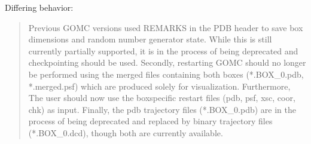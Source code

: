 \documentclass[letterpaper,10pt,english]{sphinxmanual}
\begin{document}
\sphinxAtStartPar
Differing behavior:
\begin{quote}

\sphinxAtStartPar
Previous GOMC versions used REMARKS in the PDB header to save box dimensions and random number generator state.  While this is still currently partially supported, it is in the process of being deprecated and checkpointing should be used.  Secondly, restarting GOMC should no longer be performed using the merged files containing both boxes (*.BOX\_0.pdb, *.merged.psf) which are produced solely for visualization.  Furthermore, The user should now use the box\sphinxhyphen{}specific restart files (pdb, psf, xsc, coor, chk) as input.  Finally, the pdb trajectory files (*.BOX\_0.pdb) are in the process of being deprecated and replaced by binary trajectory files (*.BOX\_0.dcd), though both are currently available.
\end{quote}
\end{document}
